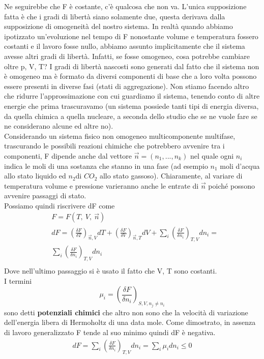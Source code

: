 \documentclass[10pt,a4paper]{article}
\begin{document}
Ne seguirebbe che F è costante, c'è qualcosa che non va. L'unica supposizione fatta è che i gradi di libertà siano solamente due, questa derivava dalla supposizione di omogeneità del nostro sistema. In realtà quando abbiamo ipotizzato un'evoluzione nel tempo di F nonostante volume e temperatura fossero costanti e il lavoro fosse nullo, abbiamo assunto implicitamente che il sistema avesse altri gradi di libertà. Infatti, se fosse omogeneo, cosa potrebbe cambiare oltre p, V, T? I gradi di libertà nascosti sono generati dal fatto che il sistema non è omogeneo ma è formato da diversi componenti di base che a loro volta possono essere presenti in diverse fasi (stati di aggregazione). Non stiamo facendo altro che ridurre l'approssimazione con cui guardiamo il sistema, tenendo conto di altre energie che prima trascuravamo (un sistema possiede tanti tipi di energia diversa, da quella chimica a quella nucleare, a seconda dello studio che se ne vuole fare se ne considerano alcune ed altre no).\\
Considerando un sistema fisico non omogeneo multicomponente multifase, trascurando le possibili reazioni chimiche che potrebbero avvenire tra i componenti, F dipende anche dal vettore $\vec{n}=(n_1,...,n_k)$ nel quale ogni \(n_i\) indica le moli di una sostanza che stanno in una fase (ad esempio \(n_1\) moli d'acqua allo stato liquido ed \(n_2\)di \(CO_2\) allo stato gassoso). Chiaramente, al variare di temperatura volume e pressione varieranno anche le entrate di $\vec{n}$ poiché possono avvenire passaggi di stato.\\
Possiamo quindi riscrivere dF come  
\begin{align*}
	&F = F(T,\ V,\ \vec{n})\\
	&dF = \left(\frac{\delta F}{\delta T}\right)_{\vec{n}, V} dT + \left(\frac{\delta F}{\delta V}\right)_{\vec{n}, T} dV+\sum_i \left(\frac{\delta F}{\delta n_i}\right)_{T,V} dn_i = \\
	&\sum_i \left(\frac{\delta F}{\delta n_i}\right)_{T,V} dn_i\\
\end{align*} 
Dove nell'ultimo passaggio si è usato il fatto che V, T sono costanti.\\
I termini
 \[\mu_i = \left(\frac{\delta F}{\delta n_i}\right)_{S,V,n_j\neq n_i}\] 
 sono detti \textbf{potenziali chimici} che altro non sono che la velocità di variazione dell'energia libera di Hermoholtz di una data mole. Come dimostrato, in assenza di lavoro generalizzato F tende al suo minimo quindi dF è negativa. 
\begin{align*}
	dF = \sum_i \left(\frac{\delta F}{\delta n_i}\right)_{T,V} dn_i = \sum_i \mu_i dn_i \leq 0
\end{align*}
\end{document}

